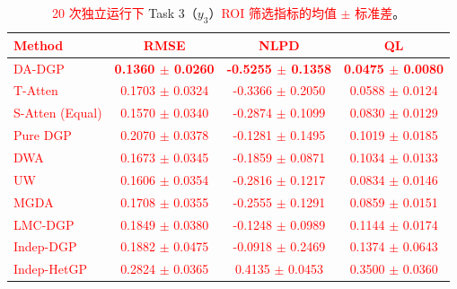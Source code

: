 \documentclass[11pt]{article}
\begin{document}
\begin{table}[htbp]
	\centering
	\small
	\caption{\textcolor{red}{Mean $\pm$ std} of \textcolor{red}{ROI-filtered metrics} for Task 3 ($y_3$) \textcolor{red}{over 20 independent runs}.}
	\caption*{\textcolor{red}{20 次独立运行下} Task 3（$y_3$）\textcolor{red}{ROI 筛选指标的均值 $\pm$ 标准差}。}
	\label{tab:results_task3}
	\begin{tabular*}{\textwidth}{@{\extracolsep{\fill}}lccc}
		\toprule
		\textbf{\textcolor{red}{Method}} & \textbf{\textcolor{red}{RMSE}} & \textbf{\textcolor{red}{NLPD}} & \textbf{\textcolor{red}{QL}} \\
		\midrule
		\textcolor{red}{DA-DGP} & \textcolor{red}{\textbf{0.1360 $\pm$ 0.0260}} & \textcolor{red}{\textbf{-0.5255 $\pm$ 0.1358}} & \textcolor{red}{\textbf{0.0475 $\pm$ 0.0080}} \\
		\textcolor{red}{T-Atten} & \textcolor{red}{0.1703 $\pm$ 0.0324} & \textcolor{red}{-0.3366 $\pm$ 0.2050} & \textcolor{red}{0.0588 $\pm$ 0.0124} \\
		\textcolor{red}{S-Atten (Equal)} & \textcolor{red}{0.1570 $\pm$ 0.0340} & \textcolor{red}{-0.2874 $\pm$ 0.1099} & \textcolor{red}{0.0830 $\pm$ 0.0129} \\
		\textcolor{red}{Pure DGP} & \textcolor{red}{0.2070 $\pm$ 0.0378} & \textcolor{red}{-0.1281 $\pm$ 0.1495} & \textcolor{red}{0.1019 $\pm$ 0.0185} \\
		\textcolor{red}{DWA} & \textcolor{red}{0.1673 $\pm$ 0.0345} & \textcolor{red}{-0.1859 $\pm$ 0.0871} & \textcolor{red}{0.1034 $\pm$ 0.0133} \\
		\textcolor{red}{UW} & \textcolor{red}{0.1606 $\pm$ 0.0354} & \textcolor{red}{-0.2816 $\pm$ 0.1217} & \textcolor{red}{0.0834 $\pm$ 0.0146} \\
		\textcolor{red}{MGDA} & \textcolor{red}{0.1708 $\pm$ 0.0355} & \textcolor{red}{-0.2555 $\pm$ 0.1291} & \textcolor{red}{0.0859 $\pm$ 0.0151} \\
		\textcolor{red}{LMC-DGP} & \textcolor{red}{0.1849 $\pm$ 0.0380} & \textcolor{red}{-0.1248 $\pm$ 0.0989} & \textcolor{red}{0.1144 $\pm$ 0.0174} \\
		\textcolor{red}{Indep-DGP} & \textcolor{red}{0.1882 $\pm$ 0.0475} & \textcolor{red}{-0.0918 $\pm$ 0.2469} & \textcolor{red}{0.1374 $\pm$ 0.0643} \\
		\textcolor{red}{Indep-HetGP} & \textcolor{red}{0.2824 $\pm$ 0.0365} & \textcolor{red}{0.4135 $\pm$ 0.0453} & \textcolor{red}{0.3500 $\pm$ 0.0360} \\
		\bottomrule
	\end{tabular*}
\end{table}
\end{document}

